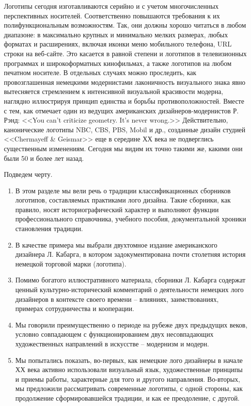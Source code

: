Логотипы сегодня изготавливаются серийно и с учетом многочисленных перспективных
носителей. Соответственно повышаются требования к их полифункциональным возможностям. Так, они
должны хорошо читаться в любом диапазоне: в максимально крупных и минимально мелких размерах, любых
форматах и расширениях, включая иконки меню мобильного телефона, URL строки на веб-сайте. Это
касается в равной степени и логотипов в телевизионных программах и широкоформатных кинофильмах, а
также логотипов на любом печатном носителе. В отдельных случаях можно проследить, как
провозглашенная немецкими модернистами лаконичность визуального знака явно вытесняется стремлением к
интенсивной визуальной красивости модерна, наглядно иллюстрируя принцип единства и борьбы
противоположностей. Вместе с тем, как отмечает один из ведущих американских дизайнеров-модернистов
Р. Рэнд: <<You can’t criticize geometry. It’s never wrong.>> Действительно, канонические логотипы NBC,
CBS, PBS, Mobil и др., созданные дизайн студией <<Chermayeff \& Geismar>> еще в середине ХХ века не
подверглись существенным изменениям. Сегодня мы видим их точно такими же, какими они были 50 и более
лет назад.

Подведем черту.
\begin{enumerate}
\item В этом разделе мы вели речь о традиции классификационных сборников логотипов, составляемых
  практиками лого дизайна. Такие сборники, как правило, носят историографический характер и
  выполняют функции профессионального справочника, учебного пособия, документальной хроники
  становления традиции.
\item В качестве примера мы выбрали двухтомное издание американского дизайнера Л. Кабарга, в котором
  задокументирована почти столетняя история немецкой торговой марки (логотипа).
\item Помимо богатого иллюстративного материала, сборники Л. Кабарга содержат ценный
  культурно-исторический комментарий о деятельности немецких лого дизайнеров в контексте своего
  времени -- влияниях, заимствованиях, примерах сотрудничества и кооперации.
\item Мы говорили преимущественно о периоде на рубеже двух предыдущих веков, условно совпадающем с
  функционированием двух несовпадающих художественных направлений в искусстве -- модернизм и модерн.
\item Мы попытались показать, во-первых, как немецкие лого дизайнеры в начале ХХ века активно
  использовали визуальный язык, художественные принципы и приемы работы, характерные для того и
  другого направления. Во-вторых, мы предложили рассматривать современные логотипы, с одной стороны,
  как продолжение сформировавшейся традиции, и как ее преодоление, с другой.
\end{enumerate}

